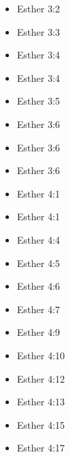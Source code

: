 \documentclass[14pt]{book}
\begin{document}
\begin{multicols}{2}
\begin{itemize}
							\item Esther 3:2
							
							\item Esther 3:3
							
							\item Esther 3:4
							
							\item Esther 3:4
							
							\item Esther 3:5
							
							\item Esther 3:6
							
							\item Esther 3:6
							
							\item Esther 3:6
							
							\item Esther 4:1
							
							\item Esther 4:1
							
							\item Esther 4:4
							
							\item Esther 4:5
							
							\item Esther 4:6
							
							\item Esther 4:7
							
							\item Esther 4:9
							
							\item Esther 4:10
							
							\item Esther 4:12
							
							\item Esther 4:13
							
							\item Esther 4:15
							
							\item Esther 4:17
							

\end{itemize}
\end{multicols}
\end{document}
